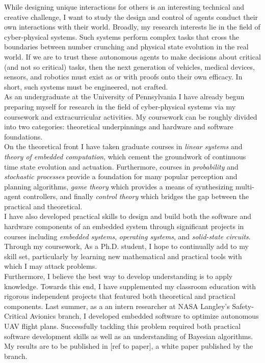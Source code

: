 \documentclass[]{article}
\begin{document}
While designing unique interactions for others is an interesting technical and creative challenge, I want to study the design and control of agents conduct their own interactions with their world. Broadly, my research interests lie in the field of cyber-physical systems. Such systems perform complex tasks that cross the boundaries between number crunching and physical state evolution in the real world. If we are to trust these autonomous agents to make decisions about critical (and not so critical) tasks, then the next generation of vehicles, medical devices, sensors, and robotics must exist as or with proofs onto their own efficacy. In short, such systems must be engineered, not crafted.\\

As an undergraduate at the University of Pennsylvania I have already begun preparing myself for research in the field of cyber-physical systems via my coursework and extracurricular activities. My coursework can be roughly divided into two categories: theoretical underpinnings and hardware and software foundations.\\

On the theoretical front I have taken graduate courses in \textit{linear systems} and \textit{theory of embedded computation}, which cement the groundwork of continuous time state evolution and actuation. Furthermore, courses in \textit{probability} and \textit{stochastic processes} provide a foundation for many popular perception and planning algorithms, \textit{game theory} which provides a means of synthesizing multi-agent controllers, and finally  \textit{control theory} which bridges the gap between the practical and theoretical.\\

I have also developed practical skills to design and build both the software and hardware components of an embedded system through significant projects in courses including \textit{embedded systems}, \textit{operating systems}, and \textit{solid-state circuits}. Through my coursework,  As a Ph.D. student, I hope to continually add to my skill set, particularly by learning new mathematical and practical tools with which I may attack problems.\\

Furthermore, I believe the best way to develop understanding is to apply knowledge. Towards this end, I have supplemented my classroom education with rigorous independent projects that featured both theoretical and practical components. Last summer, as a an intern researcher at NASA Langley's Safety-Critical Avionics branch, I developed embedded software to optimize autonomous UAV flight plans. Successfully tackling this problem required both practical software development skills as well as an understanding of Bayesian algorithms. My results are to be published in [ref to paper], a white paper published by the branch.\\
\end{document}
